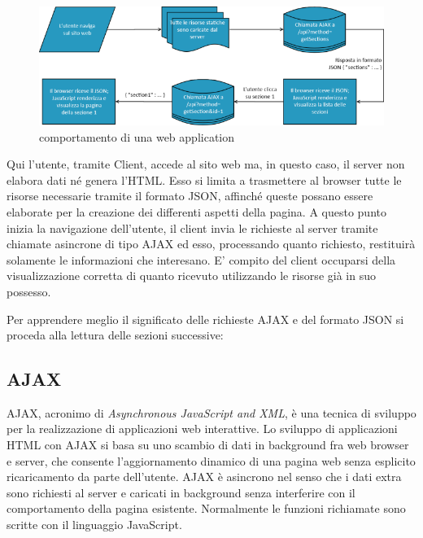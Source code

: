 \vspace{1cm}
\begin{figure}[htbp]
\begin{center}
\includegraphics[width=13cm]{contents/images/web_application}
\end{center}
\caption{comportamento di una web application}
\label{fig:flow_1}
\end{figure}
\vspace{1cm}

Qui l’utente, tramite Client, accede al sito web ma, in questo caso, il server non elabora dati né genera l’HTML. Esso si limita a trasmettere al browser tutte le risorse necessarie tramite il formato JSON, affinché queste possano essere elaborate per la creazione dei differenti aspetti della pagina. A questo punto inizia la navigazione dell’utente, il client invia le richieste al server tramite chiamate asincrone di tipo AJAX ed esso, processando quanto richiesto, restituirà solamente le informazioni che interesano. E’ compito del client occuparsi della visualizzazione corretta di quanto ricevuto utilizzando le risorse già in suo possesso.

\newpage

Per apprendere meglio il significato  delle richieste AJAX e del formato JSON si proceda alla lettura delle sezioni successive:

\subsection{AJAX} %
\label{sub:ajax}
AJAX, acronimo di {\itshape Asynchronous JavaScript and XML}, è una tecnica di sviluppo per la realizzazione di applicazioni web interattive. Lo sviluppo di applicazioni HTML con AJAX si basa su uno scambio di dati in background fra web browser e server, che consente l'aggiornamento dinamico di una pagina web senza esplicito ricaricamento da parte dell'utente. AJAX è asincrono nel senso che i dati extra sono richiesti al server e caricati in background senza interferire con il comportamento della pagina esistente. Normalmente le funzioni richiamate sono scritte con il linguaggio JavaScript.

